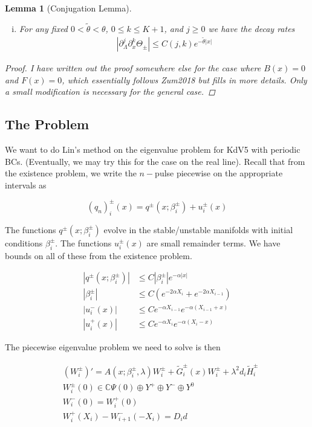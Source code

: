 \documentclass[12pt]{article}
\def\C{{\mathbb C}}
\newtheorem{lemma}{Lemma}
\begin{document}
\begin{lemma}[Conjugation Lemma]
\begin{enumerate}[(i)]
where

\[
G(x; \Lambda) = P_\pm(x, \Lambda)^{-1} F(x)
\]

\item For any fixed $0 < \tilde{\theta} < \theta$, $0 \leq k \leq K+1$, and $j \geq 0$ we have the decay rates
\begin{align*}
\left| \partial_\Lambda^j \partial_x^k \Theta_\pm \right| \leq C(j, k)e^{-\tilde{\theta}|x|}
\end{align*}
\end{enumerate}
\begin{proof}
I have written out the proof somewhere else for the case where $B(x) = 0$ and $F(x) = 0$, which essentially follows Zum2018 but fills in more details. Only a small modification is necessary for the general case.
\end{proof}
\end{lemma}

\subsection*{The Problem}

We want to do Lin's method on the eigenvalue problem for KdV5 with periodic BCs. (Eventually, we may try this for the case on the real line). Recall that from the existence problem, we write the $n-$pulse piecewise on the appropriate intervals as

\[
(q_n)_i^\pm(x) = q^\pm(x; \beta_i^\pm) + u_i^\pm(x)
\]

The functions $q^\pm(x; \beta_i^\pm)$ evolve in the stable/unstable manifolds with initial conditions $\beta_i^\pm$. The functions $u_i^\pm(x)$ are small remainder terms. We have bounds on all of these from the existence problem.

\begin{align*}
|q^\pm(x; \beta_i^\pm)| &\leq C |\beta_i^\pm| e^{-\alpha |x|} \\
|\beta_i^\pm| &\leq C (e^{-2 \alpha X_i} + e^{-2 \alpha X_{i-1}}) \\
|u_i^-(x)| &\leq C e^{-\alpha X_{i-1}} e^{-\alpha(X_{i-1} + x) } \\
|u_i^+(x)| &\leq C e^{-\alpha X_i} e^{-\alpha(X_i - x) } 
\end{align*}

The piecewise eigenvalue problem we need to solve is then

\begin{align*}
&(W_i^\pm)' = A(x; \beta_i^\pm, \lambda ) W_i^\pm + \tilde{G}_i^\pm(x) W_i^\pm + \lambda^2 d_i \tilde{H}_i^\pm \\
&W_i^\pm(0) \in \C \Psi(0) \oplus Y^+ \oplus Y^- \oplus Y^0 \\
&W_i^-(0) = W_i^+(0) \\
&W_i^+(X_i) - W_{i+1}^-(-X_i) = D_i d
\end{align*}
\end{document}
